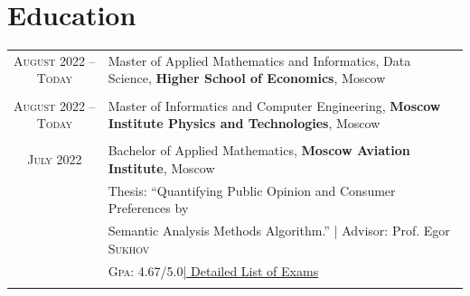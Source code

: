 \documentclass[a4paper,10pt]{article} %
\begin{document}

\section{Education}
\begin{tabular}{cp{10.5cm}}	
\textsc{August} 2022 -- \textsc{Today} & Master of Applied Mathematics and Informatics, Data Science, \textbf{Higher School of Economics}, Moscow\\
\\
\textsc{August} 2022 -- \textsc{Today} & Master of Informatics and Computer Engineering, \textbf{Moscow Institute Physics and Technologies}, Moscow\\
\\
\textsc{July} 2022 & Bachelor of Applied Mathematics, \textbf{Moscow Aviation Institute}, Moscow\\
& Thesis: ``Quantifying Public Opinion and Consumer Preferences by \\&Semantic Analysis Methods Algorithm.'' | \small Advisor: Prof. Egor \textsc{Sukhov}\\
&\normalsize \textsc{Gpa}: 4.67/5.0\hyperlink{grds}{\hfill | \footnotesize Detailed List of Exams}\\
&\\
\end{tabular}






\end{document}
